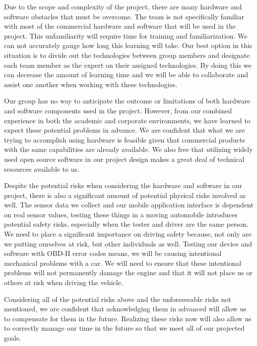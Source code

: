 \documentclass[12pt]{article}
\begin{document}
Due to the scope and complexity of the project, there are many hardware and software obstacles that must be overcome.  The team is not specifically familiar with most of the commercial hardware and software that will be used in the project.  This unfamiliarity will require time for training and familiarization.  We can not accurately gauge how long this learning will take.  Our best option in this situation is to divide out the technologies between group members and designate each team member as the expert on their assigned technologies.  By doing this we can decrease the amount of learning time and we will be able to collaborate and assist one another when working with these technologies.

Our group has no way to anticipate the outcome or limitations of both hardware and software components used in the project.  However, from our combined experience in both the academic and corporate environments, we have learned to expect these potential problems in advance.  We are confident that what we are trying to accomplish using hardware is feasible given that commercial products with the same capabilities are already available.  We also free that utilizing widely used open source software in our project design makes a great deal of technical resources available to us.

Despite the potential risks when considering the hardware and software in our project, there is also a significant amount of potential physical risks involved as well.  The sensor data we collect and our mobile application interface is dependent on real sensor values, testing these things in a moving automobile introduces potential safety risks, especially when the tester and driver are the same person.  We need to place a significant importance on driving safety because, not only are we putting ourselves at risk, but other individuals as well.  Testing our device and software with OBD-II error codes means, we will be causing intentional mechanical problems with a car.  We will need to ensure that these intentional problems will not permanently damage the engine and that it will not place us or others at risk when driving the vehicle. 

Considering all of the potential risks above and the unforeseeable risks not mentioned, we are confident that acknowledging them in advanced will allow us to compensate for them in the future.  Realizing these risks now will also allow us to correctly manage our time in the future so that we meet all of our projected goals.
\end{document}
